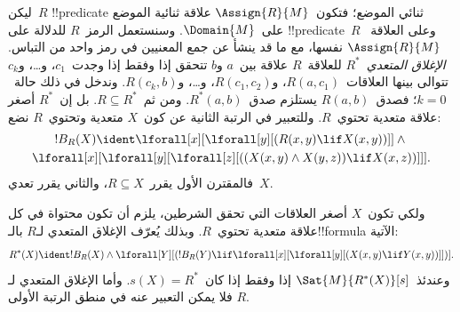 \documentclass[../../../include/open-logic-section]{subfiles}
\begin{document}
\begin{ex}
ليكن~$R$ !!{predicate} ثنائي الموضع؛ فتكون~$\Assign{R}{M}$
علاقة ثنائية الموضع على~$\Domain{M}$. وسنستعمل الرمز~$R$
للدلالة على !!{predicate}~$R$ وعلى العلاقة~$\Assign{R}{M}$
نفسها، مع ما قد ينشأ عن جمع المعنيين في رمز واحد من التباس.
\emph{الإغلاق المتعدي}~$R^*$ للعلاقة~$R$ علاقة بين~$a$ و$b$
تتحقق إذا وفقط إذا وجدت~$c_1$، و\dots، و$c_k$ تتوالى بينها
العلاقات~$R(a,c_1)$، و$R(c_1, c_2)$، و\dots، و$R(c_k,b)$.
وندخل في ذلك حالة~$k = 0$؛ فصدق~$R(a,b)$ يستلزم
صدق~$R^*(a,b)$. ومن ثم~$R \subseteq R^*$.
بل إن~$R^*$ أصغر علاقة متعدية تحتوي~$R$.
وللتعبير في الرتبة الثانية عن كون~$X$ متعدية وتحتوي~$R$ نضع:
\begin{multline*}
  !B_R(X) \ident \lforall[x][\lforall[y][(R(x,y) \lif X(x, y))]] \land {}\\
\lforall[x][\lforall[y][\lforall[z][((X(x,y) \land X(y,z)) \lif X(x,
      z))]]].
\end{multline*}
فالمقترن الأول يقرر~$R \subseteq X$، والثاني يقرر تعدي~$X$.

ولكي تكون~$X$ أصغر العلاقات التي تحقق الشرطين، يلزم أن تكون
محتواة في كل علاقة متعدية تحتوي~$R$. وبذلك يُعرّف الإغلاق المتعدي
لـ$R$ بالـ!!{formula} الآتية:
\[
R^*(X) \ident !B_R(X) \land \lforall[Y][(!B_R(Y) \lif
  \lforall[x][\lforall[y][(X(x, y) \lif Y(x,y))]])].
\]
وعندئذ~$\Sat{M}{R^*(X)}[s]$ إذا وفقط إذا كان~$s(X) = R^*$.
وأما الإغلاق المتعدي لـ$R$ فلا يمكن التعبير عنه في منطق الرتبة
الأولى.
\end{ex}
\end{document}

